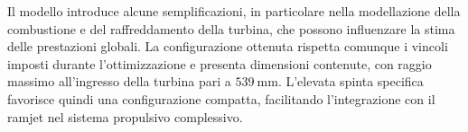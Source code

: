 Il modello introduce alcune semplificazioni, in particolare nella
modellazione della combustione e del raffreddamento della turbina, che
possono influenzare la stima delle prestazioni globali. La configurazione
ottenuta rispetta comunque i vincoli imposti durante l'ottimizzazione e
presenta dimensioni contenute, con raggio massimo all'ingresso della
turbina pari a $539\ \mathrm{mm}$. L'elevata spinta specifica favorisce
quindi una configurazione compatta, facilitando l'integrazione con il
ramjet nel sistema propulsivo complessivo.





































